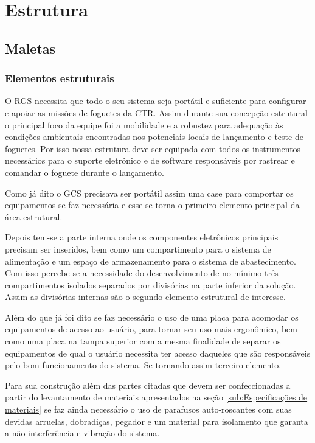 \section{Estrutura}

\subsection{Maletas}

\subsubsection{Elementos estruturais}

\par O RGS necessita que todo o seu sistema seja portátil e suficiente para configurar e apoiar as missões de foguetes da CTR. Assim durante sua concepção estrutural o principal foco da equipe foi a mobilidade e a robustez para adequação às condições ambientais encontradas nos potenciais locais de lançamento e teste de foguetes. Por isso nossa estrutura deve ser equipada com todos os instrumentos necessários para o suporte eletrônico e de software responsáveis por rastrear e comandar o foguete durante o lançamento.


\par Como já dito o GCS precisava ser portátil assim uma case para comportar os equipamentos se faz necessária e esse se torna o primeiro elemento principal da área estrutural.

\par Depois tem-se a parte interna onde os componentes eletrônicos principais precisam ser inseridos, bem como um compartimento para o sistema de alimentação e um espaço de armazenamento para o sistema de abastecimento. Com isso percebe-se a necessidade do desenvolvimento de no mínimo três compartimentos isolados separados por divisórias na parte inferior da solução. Assim as divisórias internas são o segundo elemento estrutural de interesse. 

\par Além do que já foi dito se faz necessário o uso de uma placa para acomodar os equipamentos de acesso ao usuário, para tornar seu uso mais ergonômico, bem como uma placa na tampa superior com a mesma finalidade de separar os equipamentos de qual o usuário necessita ter acesso daqueles que são responsáveis pelo bom funcionamento do sistema. Se tornando assim terceiro elemento.

\par Para sua construção além das partes citadas que devem ser confeccionadas a partir do levantamento de materiais apresentados na seção \ref{sub:Especificações de materiais} se faz ainda necessário o uso de parafusos auto-roscantes com suas devidas arruelas, dobradiças, pegador e um material para isolamento que garanta a não interferência e vibração do sistema.

